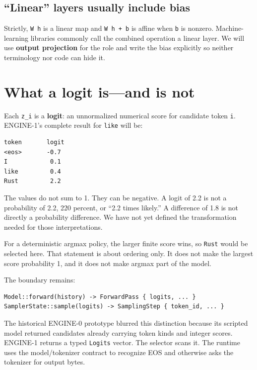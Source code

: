 \subsection{``Linear'' layers usually include
bias}\label{linear-layers-usually-include-bias}

Strictly, \texttt{W\ h} is a linear map and \texttt{W\ h\ +\ b} is
affine when \texttt{b} is nonzero. Machine-learning libraries commonly
call the combined operation a linear layer. We will use \textbf{output
projection} for the role and write the bias explicitly so neither
terminology nor code can hide it.

\section{What a logit is---and is
not}\label{what-a-logit-isand-is-not}

Each \texttt{z\_i} is a \textbf{logit}: an unnormalized numerical score
for candidate token \texttt{i}. ENGINE-1's complete result for
\texttt{like} will be:

\begin{verbatim}
token       logit
<eos>       -0.7
I            0.1
like         0.4
Rust         2.2
\end{verbatim}

The values do not sum to 1. They can be negative. A logit of 2.2 is not
a probability of 2.2, 220 percent, or ``2.2 times likely.'' A difference
of 1.8 is not directly a probability difference. We have not yet defined
the transformation needed for those interpretations.

For a deterministic argmax policy, the larger finite score wins, so
\texttt{Rust} would be selected here. That statement is about ordering
only. It does not make the largest score probability 1, and it does not
make argmax part of the model.

The boundary remains:

\begin{verbatim}
Model::forward(history) -> ForwardPass { logits, ... }
SamplerState::sample(logits) -> SamplingStep { token_id, ... }
\end{verbatim}

The historical ENGINE-0 prototype blurred this distinction because its scripted model returned
candidates already carrying token kinds and integer scores. ENGINE-1
returns a typed \texttt{Logits} vector. The selector scans it. The
runtime uses the model/tokenizer contract to recognize EOS and otherwise
asks the tokenizer for output bytes.


